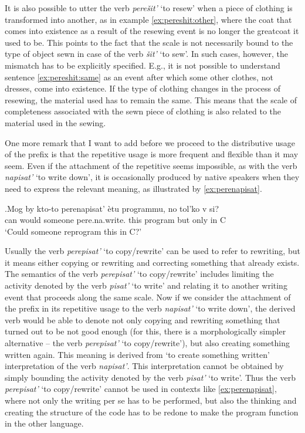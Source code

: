 It is also possible to utter the verb \textit{pere\v{s}it'} `to resew' when a piece of clothing is transformed into another, as in example \ref{ex:pereshit:other}, where the coat that comes into existence as a result of the resewing event is no longer the greatcoat it used to be. This points to the fact that the scale is not necessarily bound to the type of object sewn in case of the verb \textit{\v{s}it'} `to sew'. In such cases, however, the mismatch has to be explicitly specified. E.g., it is not possible to understand sentence \ref{ex:pereshit:same} as an event after which some other clothes, not dresses, come into existence.  If the type of clothing changes in the process of resewing, the material used has to remain the same. This means that the scale of completeness associated with the sewn piece of clothing is also related to the material used in the sewing.


One more remark that I want to add before we proceed to the distributive usage of the prefix  is that the repetitive usage is more frequent and flexible than it may seem. Even if the attachment of the repetitive  seems impossible, as with the verb \textit{napisat'} `to write down', it is occasionally produced by native speakers when they need to express the relevant meaning, as illustrated by \ref{ex:perenapisat}. 

\exg.\label{ex:perenapisat}Mog by kto-to perenapisat' \`{e}tu programmu, no tol'ko v si?\\
can would someone pere.na.write. this program but only in C\\
\trans `Could someone reprogram this in C?'

Usually the verb \textit{perepisat'} `to copy/rewrite' can be used to refer to rewriting, but it means either copying or rewriting and correcting something that already exists. The semantics of the verb \textit{perepisat'} `to copy/rewrite' includes limiting the activity denoted by the verb \textit{pisat'} `to write' and relating it to another writing event that proceeds along the same scale. Now if we consider the attachment of the  prefix in its repetitive usage to the verb \textit{napisat'} `to write down', the derived verb would be able to denote not only copying and rewriting something that turned out to be not good enough (for this, there is a morphologically simpler alternative -- the verb \textit{perepisat'} `to copy/rewrite'), but also creating something written again. This meaning is derived from `to create something written' interpretation of the verb \textit{napisat'}. This interpretation cannot be obtained by simply bounding the activity denoted by the verb \textit{pisat'} `to write'. Thus the verb \textit{perepisat'} `to copy/rewrite' cannot be used in contexts like \ref{ex:perenapisat}, where not only the writing per se has to be performed, but also the thinking and creating the structure of the code has to be redone to make the program function in the other language.

